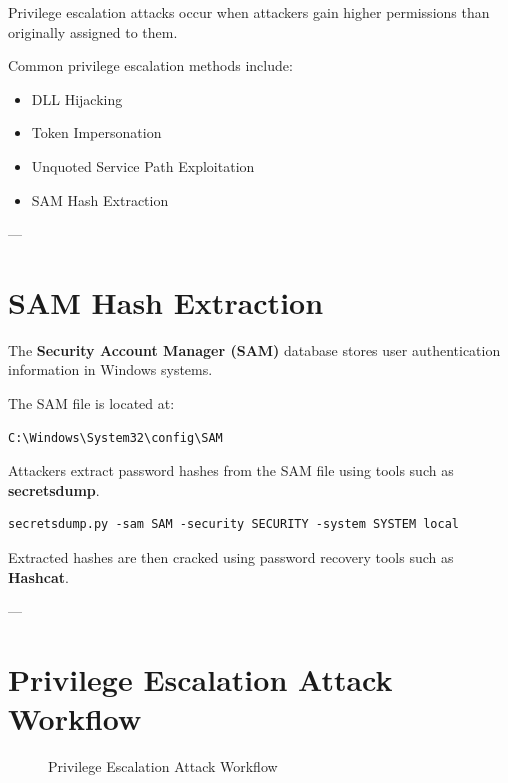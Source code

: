 Privilege escalation attacks occur when attackers gain higher permissions than originally assigned to them.

Common privilege escalation methods include:

\begin{itemize}
\item DLL Hijacking
\item Token Impersonation
\item Unquoted Service Path Exploitation
\item SAM Hash Extraction
\end{itemize}

---

\section{SAM Hash Extraction}

The \textbf{Security Account Manager (SAM)} database stores user authentication information in Windows systems.

The SAM file is located at:

\begin{verbatim}
C:\Windows\System32\config\SAM
\end{verbatim}

Attackers extract password hashes from the SAM file using tools such as \textbf{secretsdump}.

\begin{verbatim}
secretsdump.py -sam SAM -security SECURITY -system SYSTEM local
\end{verbatim}

Extracted hashes are then cracked using password recovery tools such as \textbf{Hashcat}.

---

\section{Privilege Escalation Attack Workflow}

\begin{figure}[H]
\centering
{}
\caption{Privilege Escalation Attack Workflow}
\end{figure}

